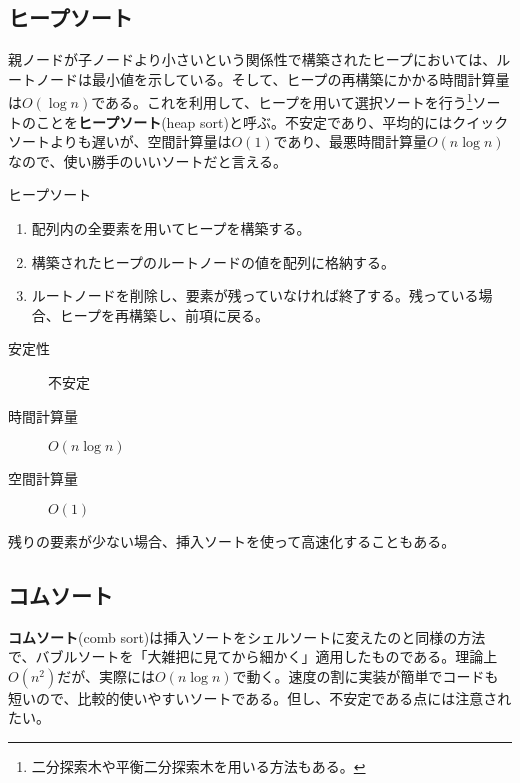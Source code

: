\subsection{ヒープソート}
親ノードが子ノードより小さいという関係性で構築されたヒープにおいては、ルートノードは最小値を示している。そして、ヒープの再構築にかかる時間計算量は$O(\log n)$である。これを利用して、ヒープを用いて選択ソートを行う\footnote{二分探索木や平衡二分探索木を用いる方法もある。}ソートのことを\textbf{ヒープソート}(heap sort)と呼ぶ。不安定であり、平均的にはクイックソートよりも遅いが、空間計算量は$O(1)$であり、最悪時間計算量$O(n\log n)$なので、使い勝手のいいソートだと言える。
\begin{itembox}[l]{ヒープソート}
\begin{enumerate}
\item 配列内の全要素を用いてヒープを構築する。
\item 構築されたヒープのルートノードの値を配列に格納する。
\item ルートノードを削除し、要素が残っていなければ終了する。残っている場合、ヒープを再構築し、前項に戻る。
\end{enumerate}
\begin{multicols}{3}
\begin{description}
\item[安定性] 不安定
\item[時間計算量] $O(n \log n)$
\item[空間計算量] $O(1)$
\end{description}
\end{multicols}
\end{itembox}

残りの要素が少ない場合、挿入ソートを使って高速化することもある。

\subsection{コムソート}
\textbf{コムソート}(comb sort)は挿入ソートをシェルソートに変えたのと同様の方法で、バブルソートを「大雑把に見てから細かく」適用したものである。理論上$O(n^2)$だが、実際には$O(n\log n)$で動く。速度の割に実装が簡単でコードも短いので、比較的使いやすいソートである。但し、不安定である点には注意されたい。

